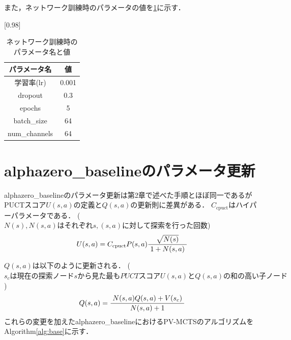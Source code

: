 また，ネットワーク訓練時のパラメータの値を\ref{table:param-train}に示す．
\begin{table}[H]
	\caption{ネットワーク訓練時のパラメータ名と値}
	\centering
	\scalebox{0.98}[0.98]{
		\begin{tabular}{c|c}
			パラメータ名 & 値 \\ \hline
			学習率(lr)    & 0.001 \\ 
			dropout    & 0.3 \\
			epochs      & 5 \\
			batch\_size     & 64 \\
			num\_channels  & 64 \\
		\end{tabular}
	}
	\label{table:param-train}
\end{table}
\section{alphazero\_baselineのパラメータ更新}
alphazero\_baselineのパラメータ更新は第2章で述べた手順とほぼ同一であるがPUCTスコア$U(s, a)$の定義と$Q(s, a)$の更新則に差異がある．
$ C_{\textrm{cpuct}}$はハイパーパラメータである．
($N(s), N(s, a)はそれぞれs,(s, a)に対して探索を行った回数$)
\begin{equation}
	{U(s, a)= C_{\textrm{cpuct}}P(s, a)\frac{\sqrt{N(s)}}{1+N(s, a)}\\
	}
\end{equation}

$Q(s, a)$は以下のように更新される．
($s_cは現在の探索ノードsから見た最もPUCTスコアU(s, a)とQ(s, a)の和の高い子ノード$)
\begin{equation}
	{Q(s, a)=\frac{N(s, a)Q(s, a)+V(s_c)}{N(s, a)+1}\\
	}
\end{equation}
これらの変更を加えたalphazero\_baselineにおけるPV-MCTSのアルゴリズムをAlgorithm\ref{alg:base}に示す．
\newpage


